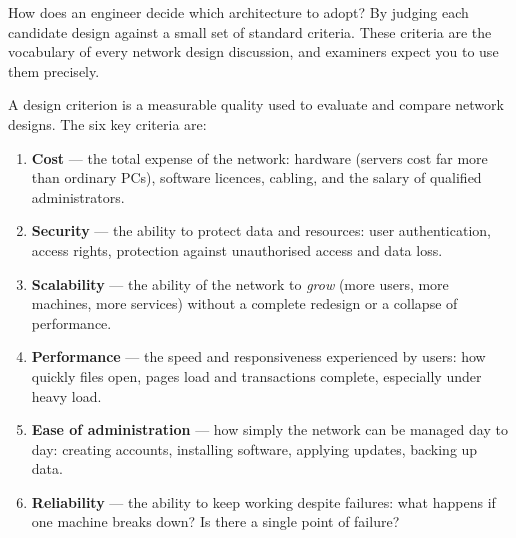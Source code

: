 \documentclass[11pt]{article}
\newcommand{\cle}[1]{{\popxbold\color{popdark}#1}}
\newcounter{popsec}
\newcounter{popsub}
\newcommand{\courssub}[1]{%
  \stepcounter{popsub}%
  \par\vspace{9pt}\noindent{\popxbold\fontsize{11.5}{13}\selectfont\color{popink}{\color{poporange}\thepopsec.\thepopsub}\hspace{6pt}#1}\par\nopagebreak\vspace{4pt}
}
\begin{document}
\courssub{The Six Design Criteria}

How does an engineer decide which architecture to adopt? By judging each candidate design against a small set of standard criteria. These criteria are the vocabulary of every network design discussion, and examiners expect you to use them precisely.

\begin{definition}
A \cle{design criterion} is a measurable quality used to evaluate and compare network designs. The six key criteria are:
\begin{enumerate}
\item \textbf{Cost} --- the total expense of the network: hardware (servers cost far more than ordinary PCs), software licences, cabling, and the salary of qualified administrators.
\item \textbf{Security} --- the ability to protect data and resources: user authentication, access rights, protection against unauthorised access and data loss.
\item \textbf{Scalability} --- the ability of the network to \emph{grow} (more users, more machines, more services) without a complete redesign or a collapse of performance.
\item \textbf{Performance} --- the speed and responsiveness experienced by users: how quickly files open, pages load and transactions complete, especially under heavy load.
\item \textbf{Ease of administration} --- how simply the network can be managed day to day: creating accounts, installing software, applying updates, backing up data.
\item \textbf{Reliability} --- the ability to keep working despite failures: what happens if one machine breaks down? Is there a single point of failure?
\end{enumerate}
\end{definition}
\end{document}
